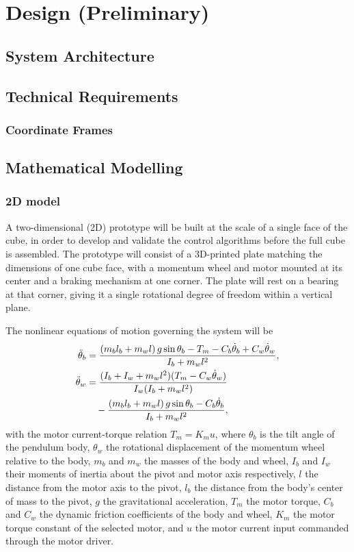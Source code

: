\section{Design (Preliminary)}

\subsection{System Architecture}

\subsection{Technical Requirements}
\subsubsection{Coordinate Frames}

\subsection{Mathematical Modelling}

\subsubsection{2D model}

A two-dimensional (2D) prototype will be built at the scale of a single face of the cube, in order to develop and validate the control algorithms before the full cube is assembled. The prototype will consist of a 3D-printed plate matching the dimensions of one cube face, with a momentum wheel and motor mounted at its center and a braking mechanism at one corner. The plate will rest on a bearing at that corner, giving it a single rotational degree of freedom within a vertical plane.

The nonlinear equations of motion governing the system will be
\begin{align}
\ddot{\theta}_b &= \frac{(m_b l_b + m_w l)\, g \sin\theta_b - T_m - C_b \dot{\theta}_b + C_w \dot{\theta}_w}{I_b + m_w l^2}, \\
\ddot{\theta}_w &= \frac{(I_b + I_w + m_w l^2)(T_m - C_w \dot{\theta}_w)}{I_w (I_b + m_w l^2)} \notag \\
&\quad - \frac{(m_b l_b + m_w l)\, g \sin\theta_b - C_b \dot{\theta}_b}{I_b + m_w l^2},
\end{align}
with the motor current-torque relation $T_m = K_m u$, where $\theta_b$ is the tilt angle of the pendulum body, $\theta_w$ the rotational displacement of the momentum wheel relative to the body, $m_b$ and $m_w$ the masses of the body and wheel, $I_b$ and $I_w$ their moments of inertia about the pivot and motor axis respectively, $l$ the distance from the motor axis to the pivot, $l_b$ the distance from the body's center of mass to the pivot, $g$ the gravitational acceleration, $T_m$ the motor torque, $C_b$ and $C_w$ the dynamic friction coefficients of the body and wheel, $K_m$ the motor torque constant of the selected motor, and $u$ the motor current input commanded through the motor driver.

